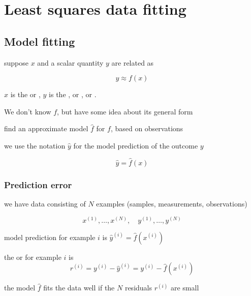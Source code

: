 \chapter{Least squares data fitting}

\section{Model fitting}

\begin{problem}
  suppose $ x $ and a scalar quantity $ y $ are related as

$$
y \approx f(x)
$$

$ x $ is the  or , $ y $ is the , or , or .

We don't know $ f $, but have some idea about its general form

\end{problem}

\begin{definition}
    find an approximate model $ \hat{f} $ for $ f $, based on observations

    we use the notation $ \hat{y} $ for the model prediction of the outcome $ y $

    $$
    \hat{y}=\hat{f}(x)
    $$
\end{definition}


\subsection{Prediction error}

we have data consisting of $ N $ examples (samples, measurements, observations)

$$
x^{(1)}, \ldots, x^{(N)}, \quad y^{(1)}, \ldots, y^{(N)}
$$

model prediction for example $ i $ is $ \hat{y}^{(i)}=\hat{f}\left(x^{(i)}\right) $

\begin{definition}
    the  or  for example $ i $ is
$$
r^{(i)}=y^{(i)}-\hat{y}^{(i)}=y^{(i)}-\hat{f}\left(x^{(i)}\right)
$$
\end{definition}



the model $ \hat{f} $ fits the data well if the $ N $ residuals $ r^{(i)} $ are small

